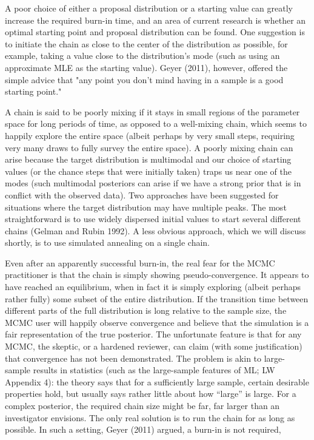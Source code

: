 \documentclass{article}
\begin{document}
A poor choice of either a proposal distribution or a starting value can greatly increase the required burn-in time, and an area of current research is whether an optimal starting point and proposal distribution can be found. One suggestion is to initiate the chain as close to the center of the distribution as possible, for example, taking a value close to the distribution's mode (such as using an approximate MLE as the starting value). Geyer (2011), however, offered the simple advice that "any point you don't mind having in a sample is a good starting point."

A chain is said to be poorly mixing if it stays in small regions of the parameter space for long periods of time, as opposed to a well-mixing chain, which seems to happily explore the entire space (albeit perhaps by very small steps, requiring very many draws to fully survey the entire space). A poorly mixing chain can arise because the target distribution is multimodal and our choice of starting values (or the chance steps that were initially taken) traps us near one of the modes (such multimodal posteriors can arise if we have a strong prior that is in conflict with the observed data). Two approaches have been suggested for situations where the target distribution may have multiple peaks. The most straightforward is to use widely dispersed initial values to start several different chains (Gelman and Rubin 1992). A less obvious approach, which we will discuss shortly, is to use simulated annealing on a single chain.

Even after an apparently successful burn-in, the real fear for the MCMC practitioner is that the chain is simply showing pseudo-convergence. It appears to have reached an equilibrium, when in fact it is simply exploring (albeit perhaps rather fully) some subset of the entire distribution. If the transition time between different parts of the full distribution is long relative to the sample size, the MCMC user will happily observe convergence and believe that the simulation is a fair representation of the true posterior. The unfortunate feature is that for any MCMC, the skeptic, or a hardened reviewer, can claim (with some justification) that convergence has not been demonstrated. The problem is akin to large-sample results in statistics (such as the large-sample features of ML; LW Appendix 4): the theory says that for a sufficiently large sample, certain desirable properties hold, but usually says rather little about how “large” is large. For a complex posterior, the required chain size might be far, far larger than an investigator envisions. The only real solution is to run the chain for as long as possible. In such a setting, Geyer (2011) argued, a burn-in is not required,
\end{document}
